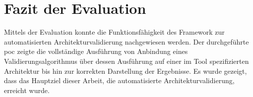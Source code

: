 \section{Fazit der Evaluation}
\label{sec:fazitevaluation}

Mittels der Evaluation konnte die Funktionsfähigkeit des Framework zur automatisierten Architekturvalidierung nachgewiesen werden. Der durchgeführte \gls{poc} zeigte die vollständige Ausführung von Anbindung eines Validierungsalgorithmus über dessen Ausführung auf einer im Tool spezifizierten Architektur bis hin zur korrekten Darstellung der Ergebnisse. Es wurde gezeigt, dass das Hauptziel dieser Arbeit, die automatisierte Architekturvalidierung, erreicht wurde.